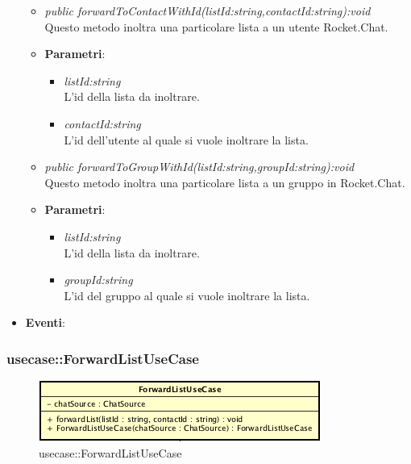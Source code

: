 \begin{itemize}
\begin{itemize}
	\item \textit{public forwardToContactWithId(listId:string,contactId:string):void}\\
	Questo metodo inoltra una particolare lista a un utente Rocket.Chat.
			\item{\textbf{Parametri}: \begin{itemize}
			\item \textit{listId:string}\\
			L'id della lista da inoltrare.
			\item \textit{contactId:string}\\
			L'id dell'utente al quale si vuole inoltrare la lista.
			\end{itemize}}
	\item \textit{public forwardToGroupWithId(listId:string,groupId:string):void}\\
	Questo metodo inoltra una particolare lista a un gruppo in Rocket.Chat.
			\item{\textbf{Parametri}: \begin{itemize}
			\item \textit{listId:string}\\
			L'id della lista da inoltrare.
			\item \textit{groupId:string}\\
			L'id del gruppo al quale si vuole inoltrare la lista.
			\end{itemize}}
	\end{itemize}
\item \textbf{Eventi}:
\end{itemize}

\subsubsection{usecase::ForwardListUseCase}

\label{usecase::ForwardListUseCase}
\begin{figure}[ht]
	\centering
	\includegraphics[scale=0.5]{Sezioni/SottosezioniST/img/app/ForwardListUseCase.png}
	\caption{usecase::ForwardListUseCase}
\end{figure}

